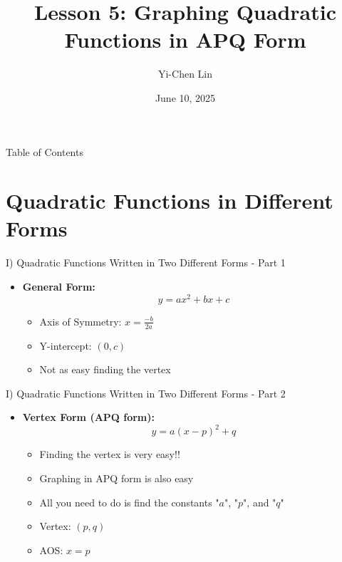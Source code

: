 \documentclass[aspectratio=169]{beamer}
\title{Lesson 5: Graphing Quadratic Functions in APQ Form}
\author{Yi-Chen Lin}
\date{June 10, 2025}
\begin{document}
\begin{frame}
    \titlepage
\end{frame}

\begin{frame}{Table of Contents}
    \tableofcontents
\end{frame}

\section{Quadratic Functions in Different Forms}

\begin{frame}{I) Quadratic Functions Written in Two Different Forms - Part 1}
    \begin{tcolorbox}[colback=lightgray,colframe=primary,title=Key Forms]
        \footnotesize
        \begin{itemize}
            \item \textbf{General Form:}
                \[ y = ax^2 + bx + c \]
                \begin{itemize}
                    \item Axis of Symmetry: $x = \frac{-b}{2a}$
                    \item Y-intercept: $(0,c)$
                    \item Not as easy finding the vertex
                \end{itemize}
        \end{itemize}
    \end{tcolorbox}
\end{frame}

\begin{frame}{I) Quadratic Functions Written in Two Different Forms - Part 2}
    \begin{tcolorbox}[colback=lightgray,colframe=primary,title=Key Forms (Cont.)]
        \footnotesize
        \begin{itemize}
            \item \textbf{Vertex Form (APQ form):}
                \[ y = a(x-p)^2 + q \]
                \begin{itemize}
                    \item Finding the vertex is very easy!!
                    \item Graphing in APQ form is also easy
                    \item All you need to do is find the constants "$a$", "$p$", and "$q$"
                    \item Vertex: $(p,q)$
                    \item AOS: $x = p$
                \end{itemize}
        \end{itemize}
    \end{tcolorbox}
\end{frame}
\end{document}
